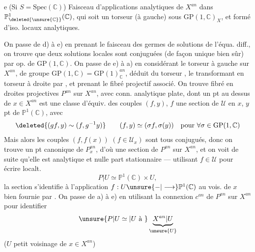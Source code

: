 \textcircled{e}\quad (Si $S=\mathrm{Spec}(\mathbb C)$)  Faisceau  d'applications analytiques de $X^{an}$ dans $\mathbb P^1_{\deleted{\unsure{\mathbb C}}}(\mathbb C)$, qui soit un torseur (à gauche) sous  $\mathrm{GP}(1,\mathbb C)_X$, et formé d'iso. locaux analytiques.

On passe de d) à e) en prenant le faisceau des germes de solutions de l'équa. diff., on trouve que deux solutions locales sont conjuguées (de façon unique bien sûr) par op. de $\mathrm{GP}(1,\mathbb C)$.
On passe de e) à a) en considérant le torseur à gauche  sur $X^{an}$, de groupe $\mathrm{GP}(1,\mathbb C)=\mathrm{GP}(1)_{\mathbb C}^{an}$, déduit du torseur , le transformant en torseur à droite par , et prenant le fibré projectif associé.
On trouve fibré en droites projectives $P^{an}$ sur $X^{an}$, avec conn. analytique plate, dont un pt au dessus de $x\in X^{an}$ est une classe d'équiv. des couples $(f,y)$, $f$ une  section de $\mathcal U$ en $x$, $y$ pt de $\mathbb P^1(\mathbb C)$, avec
\[
\deleted{(gf,y)\sim(f,g^{-1}y)}\qquad(f,y)\simeq(\sigma f,\sigma(y))\quad\text{pour }\forall\sigma\in\mathrm{GP}(1,\mathbb C)
\]
Mais alors les couples $(f,f(x))$ $(f\in\mathcal U_x)$ sont tous conjugués, donc on trouve un pt canonique de $P^{an}_x$, d'où une section de $P^{an}$ sur $X^{an}$, et on voit de suite qu'elle est analytique et nulle part stationnaire --- utilisant $f\in\mathcal U$ pour écrire localt.
\[
P|U\simeq\mathbb P^1(\mathbb C)\times U,
\]
la section \inserted{$\sigma$} s'identifie à l'application $f:U\unsure{-|\longrightarrow}\mathbb P^1(\mathbb C)$ au vois. de $x$ bien fournie par .
On passe de a) à e) en utilisant la connexion $c^{an}$ de $P^{an}$ sur $X^{an}$ pour identifier
\[
\unsure{P|U\simeq|U\text{ à }}\underbrace{X^{an}|U}_{\unsure{U}}
\]
($U$ petit voisinage de $x\in X^{an}$)
